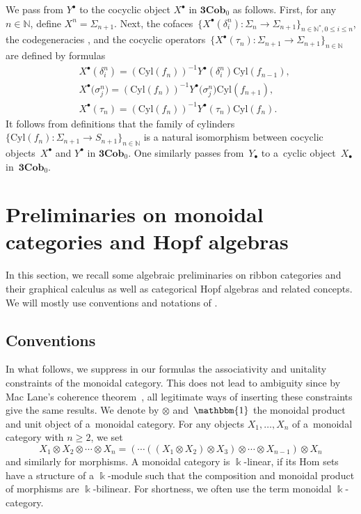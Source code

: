 \documentclass[10pt,a4paper]{amsart}
\numberwithin{equation}{section}
\newcommand{\co}{\colon}
\newcommand{\tens}{\otimes}
\newcommand{\N}{\mathbb{N}}
\newcommand{\Cyl}{\mathrm{Cyl}}
\newcommand{\Cob}{\textbf{Cob}}
\newcommand{\kk}{\Bbbk}
\newcommand{\uu}{\mathbbm{1}}
\begin{document}
We pass from $Y^\bullet$ to the cocyclic object $X^\bullet$ in $\textbf{3}\Cob_0$ as follows.
First, for any $n\in \N$, define $X^n=\Sigma_{n+1}$.
Next, the cofaces~$\{X^\bullet(\delta_i^n) \co \Sigma_n \to \Sigma_{n+1}\}_{n\in \N^*, 0\le i \le n}$, the codegeneracies \smash{$\bigl\{X^\bullet\bigl(\sigma_j^n\bigr) \co \Sigma_{n+2} \to \Sigma_{n+1}\bigr\}_{n\in \N, 0\le j \le n}$}, and the cocyclic operators~$\{X^\bullet(\tau_n) \co \Sigma_{n+1} \to \Sigma_{n+1}\}_{n\in\N}$ are defined by formulas
\begin{align*}
	&X^\bullet(\delta_i^n)=(\Cyl({f_n}))^{-1}Y^\bullet(\delta_i^n)\Cyl({f_{n-1}}), \\
	&X^\bullet\bigl(\sigma_j^n\bigr)=(\Cyl({f_n}))^{-1}Y^\bullet\bigl(\sigma_j^n\bigr)\Cyl({f_{n+1}}), \\
	&X^\bullet(\tau_n)=(\Cyl({f_n}))^{-1}Y^\bullet(\tau_n)\Cyl({f_n}).
\end{align*}
It follows from definitions that the family of cylinders~$\{\Cyl({f_n})\co \Sigma_{n+1} \to S_{n+1}\}_{n\in \N}$ is a natural isomorphism between cocyclic objects~$X^\bullet$ and $Y^\bullet$ in $\textbf{3}\Cob_0$. One similarly passes from~$Y_\bullet$ to a~cyclic object~$X_\bullet$ in~$\textbf{3}\Cob_0$.

\section{Preliminaries on monoidal categories and Hopf algebras}\label{catprelimini}

In this section, we recall some algebraic preliminaries on ribbon categories and their graphical calculus as well as categorical Hopf algebras and related concepts. We will mostly use conventions and notations of \cite{moncatstft}.

\subsection{Conventions} In what follows, we suppress in our formulas the associativity and unitality constraints of the monoidal category. This does not lead to ambiguity since by Mac Lane's coherence
theorem~\cite{maclane63}, all legitimate ways of inserting these constraints give the same results. We denote by $\tens$ and~$\uu$ the monoidal product and unit object of a~monoidal category. For any objects $X_1, \dots, X_n$ of a~monoidal category with $n\ge 2$, we set
\[
X_1 \tens X_2 \tens \cdots \tens X_n=(\cdots ((X_1\tens X_2)\tens X_3)\tens \cdots \tens X_{n-1} )\tens X_n
\]
and similarly for morphisms.
A monoidal category is $\kk$-linear, if its Hom sets have a structure of a $\kk$-module such that the composition and monoidal product of morphisms are $\kk$-bilinear. For shortness, we often use the term monoidal $\kk$-category.
\end{document}
